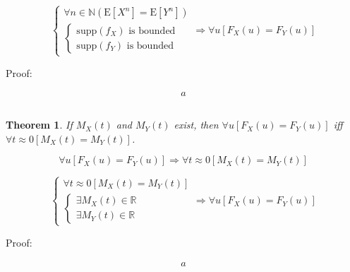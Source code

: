 \documentclass[
]{book}
\newtheorem{theorem}{Theorem}[chapter]
\theoremstyle{definition}
\theoremstyle{definition}
\theoremstyle{definition}
\theoremstyle{definition}
\theoremstyle{remark}
\begin{document}
\[
\begin{cases}
\forall n\in\mathbb{N}\left(\mathrm{E}\left[X^{n}\right]=\mathrm{E}\left[Y^{n}\right]\right)\\
\begin{cases}
\mathrm{supp}\left(f_{{\scriptscriptstyle X}}\right)\text{ is bounded}\\
\mathrm{supp}\left(f_{{\scriptscriptstyle Y}}\right)\text{ is bounded}
\end{cases}
\end{cases}\Rightarrow \forall u\left[F_{{\scriptscriptstyle X}}\left(u\right)=F_{{\scriptscriptstyle Y}}\left(u\right)\right]
\]

Proof:

\[
\begin{aligned}
a
\end{aligned}
\]

\[
\tag*{$\Box$}
\]

\begin{theorem}
\protect\hypertarget{thm:unnamed-chunk-29}{}\label{thm:unnamed-chunk-29}If \(M_{{\scriptscriptstyle X}}\left(t\right)\) and \(M_{{\scriptscriptstyle Y}}\left(t\right)\) exist, then \(\forall u\left[F_{{\scriptscriptstyle X}}\left(u\right)=F_{{\scriptscriptstyle Y}}\left(u\right)\right]\) iff \(\forall t\approx0\left[M_{{\scriptscriptstyle X}}\left(t\right)=M_{{\scriptscriptstyle Y}}\left(t\right)\right]\).
\end{theorem}

\[
\forall u\left[F_{{\scriptscriptstyle X}}\left(u\right)=F_{{\scriptscriptstyle Y}}\left(u\right)\right]\Rightarrow\forall t\approx0\left[M_{{\scriptscriptstyle X}}\left(t\right)=M_{{\scriptscriptstyle Y}}\left(t\right)\right]
\]

\[
\begin{cases}
\forall t\approx0\left[M_{{\scriptscriptstyle X}}\left(t\right)=M_{{\scriptscriptstyle Y}}\left(t\right)\right]\\
\begin{cases}
\exists M_{{\scriptscriptstyle X}}\left(t\right)\in\mathbb{R}\\
\exists M_{{\scriptscriptstyle Y}}\left(t\right)\in\mathbb{R}
\end{cases}
\end{cases}\Rightarrow\forall u\left[F_{{\scriptscriptstyle X}}\left(u\right)=F_{{\scriptscriptstyle Y}}\left(u\right)\right]
\]

Proof:

\[
\begin{aligned}
a
\end{aligned}
\]
\end{document}
